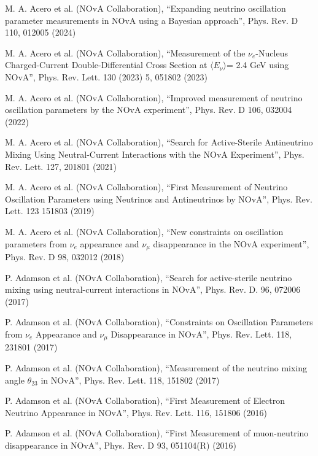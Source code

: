 \begin{list2}
\item M. A. Acero et al. (NOvA Collaboration), ``Expanding neutrino oscillation parameter measurements in NOvA using a Bayesian approach'', Phys. Rev. D 110, 012005 (2024)
\item M. A. Acero et al. (NOvA Collaboration), ``Measurement of the $\nu_e$-Nucleus Charged-Current Double-Differential Cross Section at $\langle E_\nu\rangle$= 2.4 GeV using NOvA'', Phys. Rev. Lett. 130 (2023) 5, 051802 (2023)
\item M. A. Acero et al. (NOvA Collaboration), ``Improved measurement of neutrino oscillation parameters by the NOvA experiment'', Phys. Rev. D 106, 032004 (2022)
\item M. A. Acero et al. (NOvA Collaboration), ``Search for Active-Sterile Antineutrino Mixing Using Neutral-Current Interactions with the NOvA Experiment'', Phys. Rev. Lett. 127, 201801 (2021)
\item M. A. Acero et al. (NOvA Collaboration), ``First Measurement of Neutrino Oscillation Parameters using Neutrinos and Antineutrinos by NOvA'', Phys. Rev. Lett. 123 151803 (2019)
\item M. A. Acero et al. (NOvA Collaboration), ``New constraints on oscillation parameters from $\nu_e$ appearance and $\nu_\mu$ disappearance in the NOvA experiment'', Phys. Rev. D 98, 032012 (2018)
\item P. Adamson et al. (NOvA Collaboration), ``Search for active-sterile neutrino mixing using neutral-current interactions in NOvA'', Phys. Rev. D. 96, 072006 (2017)
\item P. Adamson et al. (NOvA Collaboration), ``Constraints on Oscillation Parameters from $\nu_e$ Appearance and $\nu_\mu$ Disappearance in NOvA'', Phys. Rev. Lett. 118, 231801 (2017)
\item P. Adamson et al. (NOvA Collaboration), ``Measurement of the neutrino mixing angle $\theta_{23}$ in NOvA'', Phys. Rev. Lett. 118, 151802 (2017)
\item P. Adamson et al. (NOvA Collaboration), ``First Measurement of Electron Neutrino Appearance in NOvA'', Phys. Rev. Lett. 116, 151806 (2016)
\item P. Adamson et al. (NOvA Collaboration), ``First Measurement of muon-neutrino disappearance in NOvA'', Phys. Rev. D 93, 051104(R) (2016)
\end{list2}

